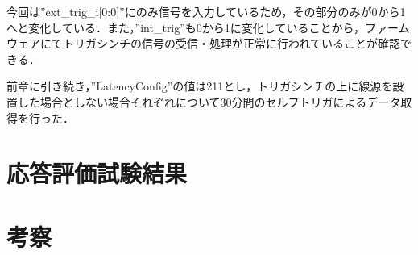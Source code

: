 今回は''ext\_trig\_i[0:0]''にのみ信号を入力しているため，その部分のみが0から1へと変化している．また，''int\_trig''も0から1に変化していることから，ファームウェアにてトリガシンチの信号の受信・処理が正常に行われていることが確認できる．\par
前章に引き続き，''LatencyConfig''の値は211とし，トリガシンチの上に線源を設置した場合としない場合それぞれについて30分間のセルフトリガによるデータ取得を行った．

\section{応答評価試験結果}
\section{考察}

